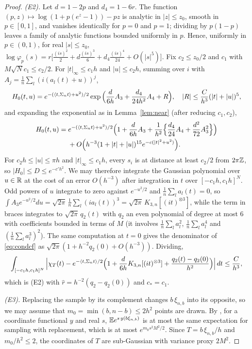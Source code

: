 \begin{proof}
\emph{\textup{(E2)}.} Let $d=1-2p$ and $d_4=1-6r$. The function $(p,z)\mapsto\log(1+p(e^z-1))-pz$ is analytic in
$|z|\le z_0$, smooth in $p\in[0,1]$, and vanishes identically for $p=0$ and $p=1$; dividing by $p(1-p)$ leaves a family
of analytic functions bounded uniformly in $p$. Hence, uniformly in $p\in(0,1)$, for real $|s|\le z_0$,
$\log\varphi_p(s)=r\big[\frac{(is)^2}2+d\frac{(is)^3}6+d_4\frac{(is)^4}{24}+O(|s|^5)\big]$. Fix $c_2\le z_0/2$ and
$c_1$ with $M\sqrt Nc_1\le c_2/2$. For $|t|_\infty\le c_1h$ and $|u|\le c_2h$, summing over $i$ with
$A_j=\frac1n\sum_l(i(a_l(t)+u))^j$,
\[
H_0(t,u)=e^{-(\langle t, \Sigma_nt\rangle+u^2)/2}\exp\Big(\frac{d}{6h}A_3+\frac{d_4}{24h^2}A_4+R\Big),\quad|R|\le\frac C{h^3}(|t|+|u|)^5 ,
\]
and expanding the exponential as in Lemma~\ref{lem:near} (after reducing $c_1,c_2$),
\begin{align*}
H_0(t,u)={}&e^{-(\langle t, \Sigma_nt\rangle+u^2)/2}\Big(1+\frac{d}{6h}A_3+\frac1{h^2}\Big\{\frac{d_4}{24}A_4+\frac{d^2}{72}A_3^2\Big\}\Big)\\
&+O\Big(h^{-3}(1+|t|+|u|)^{15}e^{-c(|t|^2+u^2)}\Big).
\end{align*}
For $c_2h\le|u|\le\pi h$ and $|t|_\infty\le c_1h$, every $s_i$ is at distance at least $c_2/2$ from $2\pi\mathbb{Z}$, so
$|H_0|\le D\le e^{-c'h^2}$. We may therefore integrate the Gaussian polynomial over $u\in\mathbb{R}$ at the cost of an error
$O(h^{-3})$ after integration in $t$ over $[-c_1h,c_1h]^N$. Odd powers of $u$ integrate to zero against $e^{-u^2/2}$
and $\frac1n\sum_la_l(t)=0$, so
$\int A_3e^{-u^2/2}du=\sqrt{2\pi}\,\frac1n\sum_l(ia_l(t))^3=\sqrt{2\pi}\,K_{3,n}[(it)^{\otimes3}]$, while the term in braces
integrates to $\sqrt{2\pi}\,q_2(t)$ with $q_2$ an even polynomial of degree at most $6$ with coefficients bounded in terms
of $M$ (it involves $\frac1n\sum_la_l^2$, $\frac1n\sum_la_l^4$ and $(\frac1n\sum_la_l^3)^2$). The same computation at
$t=0$ gives the denominator of \eqref{eq:condcf} as $\sqrt{2\pi}(1+h^{-2}q_2(0)+O(h^{-3}))$. Dividing,
\[
\int_{[-c_1h,c_1h]^N}\Big|\chi_T(t)-e^{-\langle t, \Sigma_nt\rangle/2}\Big(1+\frac{d}{6h}K_{3,n}[(it)^{\otimes3}]+\frac{q_2(t)-q_2(0)}{h^2}\Big)\Big|\,dt\le\frac C{h^3},
\]
which is \textup{(E2)} with $\widehat r=h^{-2}(q_2-q_2(0))$ and $c_\ast=c_1$.

\emph{\textup{(E3)}.} Replacing the sample by its complement changes $b\,\xi_{n,b}$ into its opposite, so we may assume
that $m_0=\min(b,n-b)\le2h^2$ points are drawn. By \citet[Theorem~4]{hoeffding}, for a coordinate functional $y$ and
real $s$, $\mathbb{E} e^{s\,y(b\xi_{n,b})}$ is at most the same expectation for sampling with replacement, which is at most
$e^{m_0s^2M^2/2}$. Since $T=b\,\xi_{n,b}/h$ and $m_0/h^2\le2$, the coordinates of $T$ are sub-Gaussian with variance proxy $2M^2$.
\end{proof}

